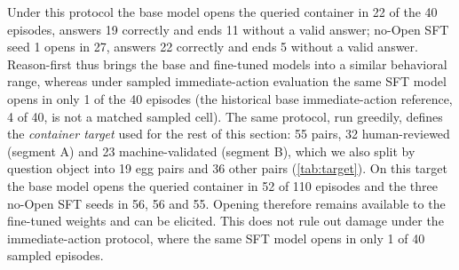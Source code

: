 \documentclass{article}
\begin{document}
Under this protocol the base model opens the queried container in 22 of the 40 episodes, answers 19 correctly and ends 11 without a valid answer; no-Open SFT seed 1 opens in 27, answers 22 correctly and ends 5 without a valid answer. Reason-first thus brings the base and fine-tuned models into a similar behavioral range, whereas under sampled immediate-action evaluation the same SFT model opens in only 1 of the 40 episodes (the historical base immediate-action reference, 4 of 40, is not a matched sampled cell). The same protocol, run greedily, defines the \emph{container target} used for the rest of this section: 55 pairs, 32 human-reviewed (segment A) and 23 machine-validated (segment B), which we also split by question object into 19 egg pairs and 36 other pairs (\cref{tab:target}). On this target the base model opens the queried container in 52 of 110 episodes and the three no-Open SFT seeds in 56, 56 and 55. Opening therefore remains available to the fine-tuned weights and can be elicited. This does not rule out damage under the immediate-action protocol, where the same SFT model opens in only 1 of 40 sampled episodes.
\end{document}
